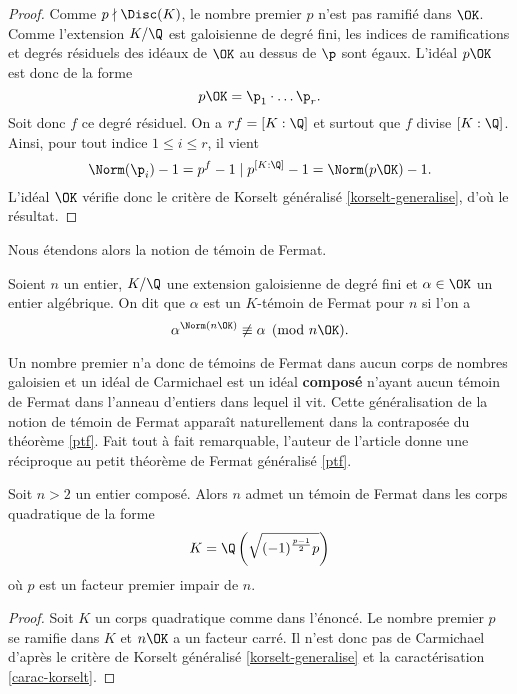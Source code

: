 \begin{proof}
	Comme $p\nmid \Disc(K)$, le nombre premier $p$ n'est pas ramifié dans $\OK$. Comme l'extension $K/\Q$ est galoisienne de degré fini, les indices de ramifications et degrés résiduels des idéaux de $\OK$ au dessus de $\p$ sont égaux. L'idéal $p\OK$ est donc de la forme \[p\OK = \p_1\cdot \dots \p_r.\] Soit donc $f$ ce degré résiduel. On a $rf = [K : \Q]$ et surtout que $f$ divise $[ K : \Q ]$. Ainsi, pour tout indice $1\leq i \leq r$, il vient \[ \Norm(\p_i) - 1 = p^f - 1 \mid p^{[K : \Q]} - 1 = \Norm(p\OK) - 1.\] L'idéal $\OK$ vérifie donc le critère de Korselt généralisé \ref{korselt-generalise}, d'où le résultat.
\end{proof}

Nous étendons alors la notion de témoin de Fermat.

\begin{definition}\label{def-K-temoin}
	Soient $n$ un entier, $K/\Q$ une extension galoisienne de degré fini et $\alpha\in \OK$ un entier algébrique. On dit que $\alpha$ est un $K$-témoin de Fermat pour $n$ si l'on a \[\alpha^{\Norm(n\OK)} \not \equiv \alpha \pmod{n\OK}.\]
\end{definition}

Un nombre premier n'a donc de témoins de Fermat dans aucun corps de nombres galoisien et un idéal de Carmichael est un idéal \textbf{composé} n'ayant aucun témoin de Fermat dans l'anneau d'entiers dans lequel il vit. Cette généralisation de la notion de témoin de Fermat apparaît naturellement dans la contraposée du théorème \ref{ptf}. Fait tout à fait remarquable, l'auteur de l'article donne une réciproque au petit théorème de Fermat généralisé \ref{ptf}.

\begin{theoreme}\label{ptf-reciproque}
	Soit $n>2$ un entier composé. Alors $n$ admet un témoin de Fermat dans les corps quadratique de la forme \[K = \Q\left(\sqrt{(-1)^{\frac{p-1}{2}}p}\right)\] où $p$ est un facteur premier impair de $n$.
\end{theoreme}

\begin{proof}
	Soit $K$ un corps quadratique comme dans l'énoncé. Le nombre premier $p$ se ramifie dans $K$ et $n\OK$ a un facteur carré. Il n'est donc pas de Carmichael d'après le critère de Korselt généralisé \ref{korselt-generalise} et la caractérisation \ref{carac-korselt}.
\end{proof}


